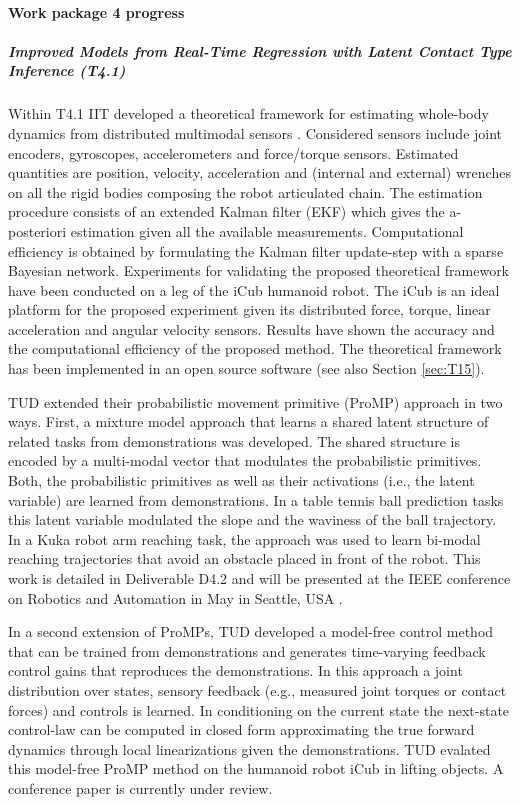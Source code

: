 

\paragraph{Work package 4 progress}

\subparagraph{Improved Models from Real-Time Regression with Latent Contact Type Inference (T4.1)}%

Within T4.1 IIT developed a theoretical framework for estimating whole-body
dynamics from distributed multimodal sensors \cite{Nori2015}. Considered sensors
include joint encoders, gyroscopes, accelerometers and force/torque sensors.
Estimated quantities are position, velocity, acceleration and (internal and
external) wrenches on all the rigid bodies composing the robot articulated
chain. The estimation procedure consists of an extended Kalman filter (EKF)
which gives the a-posteriori estimation given all the available measurements.
Computational efficiency is obtained by formulating the Kalman filter
update-step with a sparse Bayesian network. Experiments for validating the
proposed theoretical framework have been conducted on a leg of the iCub humanoid
robot. The iCub is an ideal platform for the proposed experiment given its
distributed force, torque, linear acceleration and angular velocity sensors.
Results have shown the accuracy and the computational efficiency of the proposed
method. The theoretical framework has been implemented in an open source
software (see also Section \ref{sec:T15}).

TUD extended their probabilistic movement primitive (ProMP) approach in two
ways. First, a mixture model approach that learns a shared latent structure of
related tasks from demonstrations was developed. The shared structure is encoded
by a multi-modal vector that modulates the probabilistic primitives. Both, the
probabilistic primitives as well as their activations (i.e., the latent
variable) are learned from demonstrations. In a table tennis ball prediction
tasks this latent variable modulated the slope and the waviness of the ball
trajectory. In a Kuka robot arm reaching task, the approach was used to learn
bi-modal reaching trajectories that avoid an obstacle placed in front of the
robot. This work is detailed in Deliverable D4.2 and will be presented at the
IEEE conference on Robotics and Automation in May in Seattle, USA
\cite{Rueckert_2015}. 

In a second extension of ProMPs, TUD developed a model-free control method that
can be trained from demonstrations and generates time-varying feedback control
gains that reproduces the demonstrations. In this approach a joint distribution
over states, sensory feedback (e.g., measured joint torques or contact forces)
and controls is learned. In conditioning on the current state the next-state
control-law can be computed in closed form approximating the true forward
dynamics through local linearizations given the demonstrations. TUD evalated
this model-free ProMP method on the humanoid robot iCub in lifting objects. A
conference paper is currently under review. 


